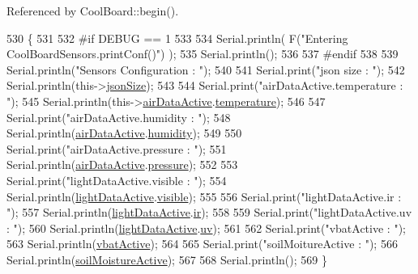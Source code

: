 Referenced by Cool\+Board\+::begin().


\begin{DoxyCode}
530 \{
531 
532 \textcolor{preprocessor}{#if DEBUG == 1}
533 
534     Serial.println( F(\textcolor{stringliteral}{"Entering CoolBoardSensors.printConf()"}) );
535     Serial.println();
536 
537 \textcolor{preprocessor}{#endif}
538 
539     Serial.println(\textcolor{stringliteral}{"Sensors Configuration : "});
540     
541     Serial.print(\textcolor{stringliteral}{"json size : "});
542     Serial.println(this->\hyperlink{classCoolBoardSensors_a05a40dc80bfff14ffb830f549b876f8d}{jsonSize});
543 
544     Serial.print(\textcolor{stringliteral}{"airDataActive.temperature : "});
545     Serial.println(this->\hyperlink{classCoolBoardSensors_abff8dfeccb2f7689847bb64d5f1cd31e}{airDataActive}.\hyperlink{structCoolBoardSensors_1_1airActive_a9a6633c426b0508e30ebc1832ec6d745}{temperature});
546 
547     Serial.print(\textcolor{stringliteral}{"airDataActive.humidity : "});
548     Serial.println(\hyperlink{classCoolBoardSensors_abff8dfeccb2f7689847bb64d5f1cd31e}{airDataActive}.\hyperlink{structCoolBoardSensors_1_1airActive_ae5740445054b27415e22f450576accb7}{humidity});
549 
550     Serial.print(\textcolor{stringliteral}{"airDataActive.pressure : "});
551     Serial.println(\hyperlink{classCoolBoardSensors_abff8dfeccb2f7689847bb64d5f1cd31e}{airDataActive}.\hyperlink{structCoolBoardSensors_1_1airActive_ab200826a70d1dc9945f5efb6b9c732ed}{pressure});
552 
553     Serial.print(\textcolor{stringliteral}{"lightDataActive.visible : "});
554     Serial.println(\hyperlink{classCoolBoardSensors_ac4deb1cf41bac8b91c780c92fab00ba4}{lightDataActive}.\hyperlink{structCoolBoardSensors_1_1lightActive_abcbba296b6a95e67c0cd2555d9dd50c7}{visible});
555 
556     Serial.print(\textcolor{stringliteral}{"lightDataActive.ir : "});
557     Serial.println(\hyperlink{classCoolBoardSensors_ac4deb1cf41bac8b91c780c92fab00ba4}{lightDataActive}.\hyperlink{structCoolBoardSensors_1_1lightActive_a67700895349b95ceb263f1a6da756315}{ir});
558 
559     Serial.print(\textcolor{stringliteral}{"lightDataActive.uv : "});
560     Serial.println(\hyperlink{classCoolBoardSensors_ac4deb1cf41bac8b91c780c92fab00ba4}{lightDataActive}.\hyperlink{structCoolBoardSensors_1_1lightActive_a949a7aaf5166d981de8fe0fd93da20d6}{uv});
561     
562     Serial.print(\textcolor{stringliteral}{"vbatActive : "});
563     Serial.println(\hyperlink{classCoolBoardSensors_af5039ad760b0ff0aa7eee16c55e81702}{vbatActive});
564 
565     Serial.print(\textcolor{stringliteral}{"soilMoitureActive : "});
566     Serial.println(\hyperlink{classCoolBoardSensors_a31983eecc0f9cd000e1f912206ea4dc8}{soilMoistureActive});
567 
568     Serial.println();
569 \}
\end{DoxyCode}
